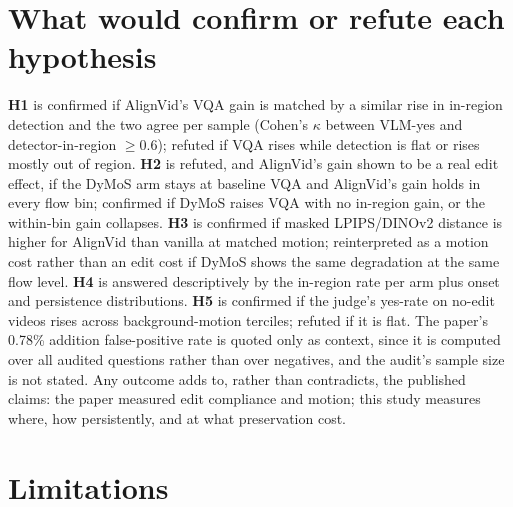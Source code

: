 \documentclass[10pt,a4paper]{article}
\begin{document}
\section{What would confirm or refute each hypothesis}

\textbf{H1} is confirmed if AlignVid's VQA gain is matched by a similar rise in in-region detection and the two agree per sample (Cohen's $\kappa$ between VLM-yes and detector-in-region $\ge 0.6$); refuted if VQA rises while detection is flat or rises mostly out of region.
\textbf{H2} is refuted, and AlignVid's gain shown to be a real edit effect, if the DyMoS arm stays at baseline VQA and AlignVid's gain holds in every flow bin; confirmed if DyMoS raises VQA with no in-region gain, or the within-bin gain collapses.
\textbf{H3} is confirmed if masked LPIPS/DINOv2 distance is higher for AlignVid than vanilla at matched motion; reinterpreted as a motion cost rather than an edit cost if DyMoS shows the same degradation at the same flow level.
\textbf{H4} is answered descriptively by the in-region rate per arm plus onset and persistence distributions.
\textbf{H5} is confirmed if the judge's yes-rate on no-edit videos rises across background-motion terciles; refuted if it is flat. The paper's 0.78\% addition false-positive rate is quoted only as context, since it is computed over all audited questions rather than over negatives, and the audit's sample size is not stated.
Any outcome adds to, rather than contradicts, the published claims: the paper measured edit compliance and motion; this study measures where, how persistently, and at what preservation cost.

\section{Limitations}
\end{document}
